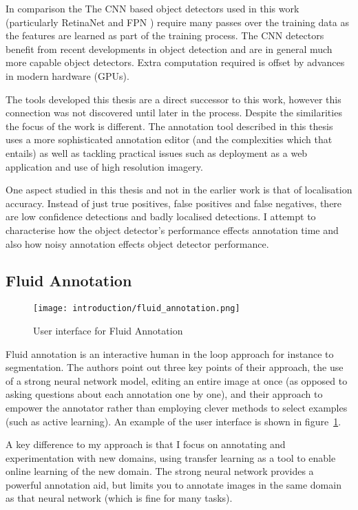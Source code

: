 In comparison the The \gls{CNN} based object detectors used in this work (particularly RetinaNet \cite{Lin2017} and \gls{FPN} \cite{Lin2017a}) require many passes over the training data as the features are learned as part of the training process. The \gls{CNN} detectors benefit from recent developments in object detection and are in general much more capable object detectors. Extra computation required is offset by advances in modern hardware (\gls{GPU}s).

The tools developed this thesis are a direct successor to this work, however this connection was not discovered until later in the process. 
Despite the similarities the focus of the work is different. The annotation tool described in this thesis uses a more sophisticated annotation editor (and the complexities which that entails) as well as tackling practical issues such as deployment as a web application and use of high resolution imagery.

One aspect studied in this thesis and not in the earlier work is that of localisation accuracy. Instead of just true positives, false positives and false negatives, there are low confidence detections and badly localised detections. I attempt to characterise how the object detector's performance effects annotation time and also how noisy annotation effects object detector performance.


\subsection{Fluid Annotation \cite{Andriluka2018}}
\begin{figure}[h]
  \centering
  \texttt{[image: introduction/fluid\_annotation.png]}
  \caption{User interface for Fluid Annotation \cite{Andriluka2018}}  
  \label{fig:fluid_annotation}
\end{figure}

Fluid annotation is an interactive human in the loop approach for instance to segmentation. The authors point out three key points of their approach, the use of a strong neural network model, editing an entire image at once (as opposed to asking questions about each annotation one by one), and their approach to empower the annotator rather than employing clever methods to select examples (such as active learning). An example of the user interface is shown in figure~\ref{fig:fluid_annotation}.

A key difference to my approach is that I focus on annotating and experimentation with new domains, using transfer learning as a tool to enable online learning of the new domain. The strong neural network provides a powerful annotation aid, but limits you to annotate images in the same domain as that neural network (which is fine for many tasks).

